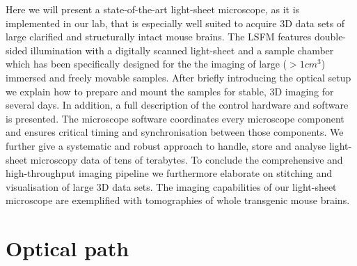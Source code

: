\documentclass[12pt]{spieman}  %
\begin{document}
Here we will present a state-of-the-art light-sheet microscope, as it is implemented in our lab, that is especially well suited to acquire 3D data sets of large clarified and structurally intact mouse brains. The LSFM features double-sided illumination with a digitally scanned light-sheet and a sample chamber which has been specifically designed for the the imaging of large ($> 1cm^3$) immersed and freely movable samples. After briefly introducing the optical setup we explain how to prepare and mount the samples for stable, 3D imaging for several days. In addition, a full description of the control hardware and software is presented. The microscope software coordinates every microscope component and ensures critical timing and synchronisation between those components. %
We further give a systematic and robust approach to handle, store and analyse light-sheet microscopy data of tens of terabytes. To conclude the comprehensive and high-throughput imaging pipeline we furthermore elaborate on stitching and visualisation of large 3D data sets. The imaging capabilities of our light-sheet microscope are exemplified with tomographies of whole transgenic mouse brains.


\section{Optical path}
\end{document}
